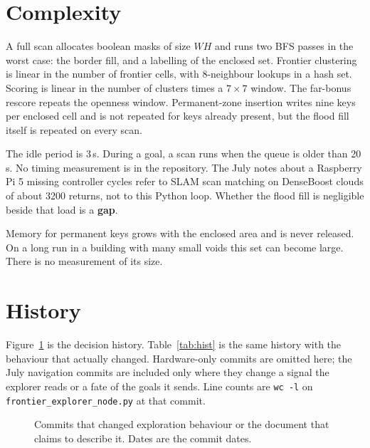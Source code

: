 \documentclass[11pt]{article}
\begin{document}
\section{Complexity}
A full scan allocates boolean masks of size $WH$ and runs two BFS passes in the worst case: the border fill, and a labelling of the enclosed set. Frontier clustering is linear in the number of frontier cells, with 8-neighbour lookups in a hash set. Scoring is linear in the number of clusters times a $7\times 7$ window. The far-bonus rescore repeats the openness window. Permanent-zone insertion writes nine keys per enclosed cell and is not repeated for keys already present, but the flood fill itself is repeated on every scan.

The idle period is 3\,s. During a goal, a scan runs when the queue is older than 20\,s. No timing measurement is in the repository. The July notes about a Raspberry Pi 5 missing controller cycles refer to SLAM scan matching on DenseBoost clouds of about 3200 returns, not to this Python loop. Whether the flood fill is negligible beside that load is a \textbf{gap}.

Memory for permanent keys grows with the enclosed area and is never released. On a long run in a building with many small voids this set can become large. There is no measurement of its size.

\section{History}
\label{sec:history}
Figure~\ref{fig:time} is the decision history. Table~\ref{tab:hist} is the same history with the behaviour that actually changed. Hardware-only commits are omitted here; the July navigation commits are included only where they change a signal the explorer reads or a fate of the goals it sends. Line counts are \texttt{wc -l} on \texttt{frontier\_explorer\_node.py} at that commit.

\begin{figure}[ht]
\centering
\FigTimeline
\caption{Commits that changed exploration behaviour or the document that claims to describe it. Dates are the commit dates.}
\label{fig:time}
\end{figure}
\end{document}
